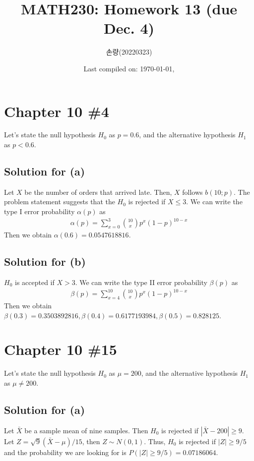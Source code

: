 \documentclass{scrartcl}
\title{MATH230: Homework 13 (due Dec. 4)}
\author{손량(20220323)}
\date{Last compiled on: \today, \currenttime}
\begin{document}
\maketitle

\section{Chapter 10 \#4}
Let's state the null hypothesis \(H_0\) as \(p = 0.6\), and the alternative
hypothesis \(H_1\) as \(p < 0.6\).

\subsection{Solution for (a)}
Let \(X\) be the number of orders that arrived late. Then, \(X\) follows
\(b(10; p)\). The problem statement suggests that the \(H_0\) is rejected if
\(X \le 3\). We can write the type I error probability \(\alpha(p)\) as
\begin{align*}
  \alpha(p)
  = \sum^3_{x = 0} {10 \choose x} p^x (1 - p)^{10 - x}
\end{align*}
Then we obtain \(\alpha(0.6) = 0.0547618816\).

\subsection{Solution for (b)}
\(H_0\) is accepted if \(X > 3\). We can write the type II error probability
\(\beta(p)\) as
\begin{align*}
  \beta(p)
  = \sum^{10}_{x = 4} {10 \choose x} p^x (1 - p)^{10 - x}
\end{align*}
Then we obtain \(\beta(0.3) = 0.3503892816, \beta(0.4) = 0.6177193984,
\beta(0.5) = 0.828125\).

\section{Chapter 10 \#15}
Let's state the null hypothesis \(H_0\) as \(\mu = 200\), and the alternative
hypothesis \(H_1\) as \(\mu \not = 200\).

\subsection{Solution for (a)}
Let \(\bar{X}\) be a sample mean of nine samples. Then \(H_0\) is rejected if
\(|\bar{X} - 200| \ge 9\). Let \(Z = \sqrt{9}(\bar{X} - \mu) / 15\), then
\(Z \sim N(0, 1)\). Thus, \(H_0\) is rejected if \(|Z| \ge 9/5\) and the
probability we are looking for is \(P(|Z| \ge 9/5) = 0.07186064\).
\end{document}

